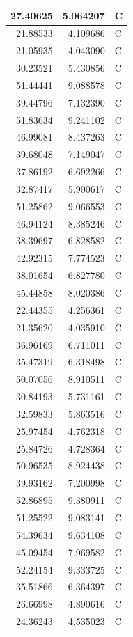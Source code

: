 \documentclass[
  letterpaper,
  DIV=11,
  numbers=noendperiod]{scrartcl}
\begin{document}
\begin{table}
\begin{tabular}[t]{r|r|l}
\hline
27.40625 & 5.064207 & C\\
\hline
21.88533 & 4.109686 & C\\
\hline
21.05935 & 4.043090 & C\\
\hline
30.23521 & 5.430856 & C\\
\hline
51.44441 & 9.088578 & C\\
\hline
39.44796 & 7.132390 & C\\
\hline
51.83634 & 9.241102 & C\\
\hline
46.99081 & 8.437263 & C\\
\hline
39.68048 & 7.149047 & C\\
\hline
37.86192 & 6.692266 & C\\
\hline
32.87417 & 5.900617 & C\\
\hline
51.25862 & 9.066553 & C\\
\hline
46.94124 & 8.385246 & C\\
\hline
38.39697 & 6.828582 & C\\
\hline
42.92315 & 7.774523 & C\\
\hline
38.01654 & 6.827780 & C\\
\hline
45.44858 & 8.020386 & C\\
\hline
22.44355 & 4.256361 & C\\
\hline
21.35620 & 4.035910 & C\\
\hline
36.96169 & 6.711011 & C\\
\hline
35.47319 & 6.318498 & C\\
\hline
50.07056 & 8.910511 & C\\
\hline
30.84193 & 5.731161 & C\\
\hline
32.59833 & 5.863516 & C\\
\hline
25.97454 & 4.762318 & C\\
\hline
25.84726 & 4.728364 & C\\
\hline
50.96535 & 8.924438 & C\\
\hline
39.93162 & 7.200998 & C\\
\hline
52.86895 & 9.380911 & C\\
\hline
51.25522 & 9.083141 & C\\
\hline
54.39634 & 9.634108 & C\\
\hline
45.09454 & 7.969582 & C\\
\hline
52.24154 & 9.333725 & C\\
\hline
35.51866 & 6.364397 & C\\
\hline
26.66998 & 4.890616 & C\\
\hline
24.36243 & 4.535023 & C\\

\end{tabular}
\end{table}
\end{document}
